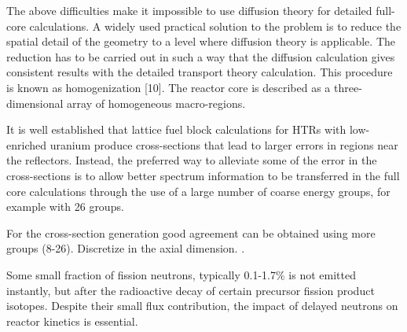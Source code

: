 \documentclass[11pt,letterpaper]{article}
\begin{document}
The above difficulties make it impossible to use diffusion theory for detailed full-core calculations.
A widely used practical solution to the problem is to reduce the spatial detail of the geometry to a level where diffusion theory is applicable. The reduction has to be carried out in such a way that the diffusion calculation gives consistent results with the detailed transport theory calculation.
This procedure is known as homogenization [10].
The reactor core is described as a three-dimensional array of homogeneous macro-regions.
\cite{leppanen_development_2007}


It is well established that lattice fuel block calculations for HTRs with low-enriched uranium produce cross-sections that lead to larger errors in regions near the reflectors.
Instead, the preferred way to alleviate some of the error in the cross-sections is to allow better spectrum information to be transferred in the full core calculations through the use of a large number of coarse energy groups, for example with 26 groups.
\cite{oecd_nea_coupled_2020}

For the cross-section generation good agreement can be obtained using more groups (8-26).
Discretize in the axial dimension.
\cite{gougar_high_2019}.


Some small fraction of fission neutrons, typically 0.1-1.7\% is not emitted instantly, but after the radioactive decay of certain precursor fission product isotopes.
Despite their small flux contribution, the impact of delayed neutrons on reactor kinetics is essential.


\cite{leppanen_development_2007}





\pagebreak


\end{document}
